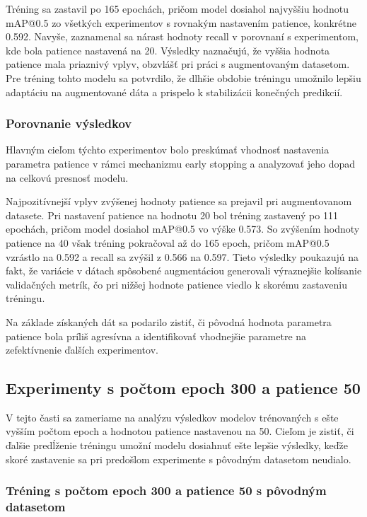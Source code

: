                 Tréning sa zastavil po 165 epochách, pričom model dosiahol najvyššiu hodnotu mAP@0.5 zo všetkých experimentov s rovnakým nastavením patience, konkrétne 0.592. Navyše, zaznamenal sa nárast hodnoty recall v porovnaní s experimentom, kde bola patience nastavená na 20. Výsledky naznačujú, že vyššia hodnota patience mala priaznivý vplyv, obzvlášť pri práci s augmentovaným datasetom. Pre tréning tohto modelu sa potvrdilo, že dlhšie obdobie tréningu umožnilo lepšiu adaptáciu na augmentované dáta a prispelo k stabilizácii konečných predikcií.

                \subsubsection{Porovnanie výsledkov}

                Hlavným cieľom týchto experimentov bolo preskúmať vhodnosť nastavenia parametra patience v rámci mechanizmu early stopping a analyzovať jeho dopad na celkovú presnosť modelu. 
                
                Najpozitívnejší vplyv zvýšenej hodnoty patience sa prejavil pri augmentovanom datasete. Pri nastavení patience na hodnotu 20 bol tréning zastavený po 111 epochách, pričom model dosiahol mAP@0.5 vo výške 0.573. So zvýšením hodnoty patience na 40 však tréning pokračoval až do 165 epoch, pričom mAP@0.5 vzrástlo na 0.592 a recall sa zvýšil z 0.566 na 0.597. Tieto výsledky poukazujú na fakt, že variácie v dátach spôsobené augmentáciou generovali výraznejšie kolísanie validačných metrík, čo pri nižšej hodnote patience viedlo k skorému zastaveniu tréningu.
                
                Na základe získaných dát sa podarilo zistiť, či pôvodná hodnota parametra patience bola príliš agresívna a identifikovať vhodnejšie parametre na zefektívnenie ďalších experimentov.
            \subsection{Experimenty s počtom epoch 300 a patience 50}

                V tejto časti sa zameriame na analýzu výsledkov modelov trénovaných s ešte vyšším počtom epoch a hodnotou patience nastavenou na 50. Cieľom je zistiť, či ďalšie predĺženie tréningu umožní modelu dosiahnuť ešte lepšie výsledky, keďže skoré zastavenie sa pri predošlom experimente s pôvodným datasetom neudialo.

                \subsubsection{Tréning s počtom epoch 300 a patience 50 s pôvodným datasetom}

